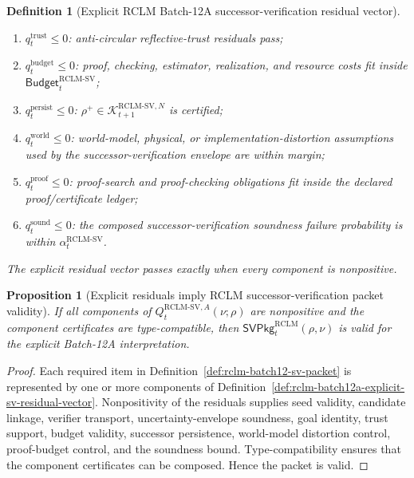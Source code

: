 \documentclass[11pt,a4paper]{article}
\newtheorem{proposition}[theorem]{Proposition}
\newtheorem{definition}[theorem]{Definition}
\newcommand{\Kcal}{\mathcal K}
\newcommand{\RCLM}{\mathrm{RCLM}}
\begin{document}
\begin{definition}[Explicit RCLM Batch-12A successor-verification residual vector]
\begin{enumerate}[label=(\roman*),leftmargin=1.5em]
    \item \(q_t^{\mathrm{trust}}\le0\): anti-circular reflective-trust residuals pass;
    \item \(q_t^{\mathrm{budget}}\le0\): proof, checking, estimator, realization, and resource costs fit inside \(\mathsf{Budget}_t^{\RCLM\text{-}\mathrm{SV}}\);
    \item \(q_t^{\mathrm{persist}}\le0\): \(\rho^+\in\Kcal_{t+1}^{\RCLM\text{-}\mathrm{SV},N}\) is certified;
    \item \(q_t^{\mathrm{world}}\le0\): world-model, physical, or implementation-distortion assumptions used by the successor-verification envelope are within margin;
    \item \(q_t^{\mathrm{proof}}\le0\): proof-search and proof-checking obligations fit inside the declared proof/certificate ledger;
    \item \(q_t^{\mathrm{sound}}\le0\): the composed successor-verification soundness failure probability is within \(\alpha_t^{\RCLM\text{-}\mathrm{SV}}\).
\end{enumerate}
The explicit residual vector passes exactly when every component is nonpositive.
\end{definition}

\begin{proposition}[Explicit residuals imply RCLM successor-verification packet validity]
\label{prop:rclm-batch12a-residuals-imply-sv-packet}
If all components of \(Q_t^{\RCLM\text{-}\mathrm{SV},A}(\nu;\rho)\) are nonpositive and the component certificates are type-compatible, then \(\mathsf{SVPkg}_t^{\RCLM}(\rho,\nu)\) is valid for the explicit Batch-12A interpretation.
\end{proposition}

\begin{proof}
Each required item in Definition~\ref{def:rclm-batch12-sv-packet} is represented by one or more components of Definition~\ref{def:rclm-batch12a-explicit-sv-residual-vector}. Nonpositivity of the residuals supplies seed validity, candidate linkage, verifier transport, uncertainty-envelope soundness, goal identity, trust support, budget validity, successor persistence, world-model distortion control, proof-budget control, and the soundness bound. Type-compatibility ensures that the component certificates can be composed. Hence the packet is valid.
\end{proof}
\end{document}
